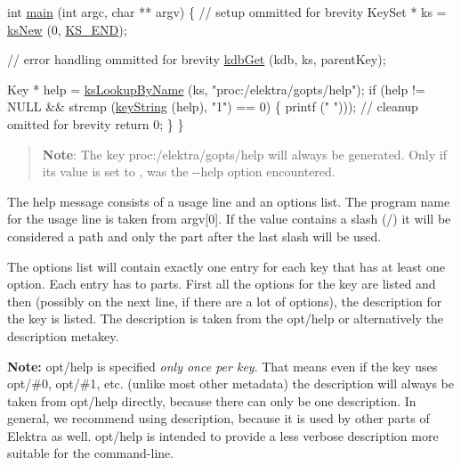 \begin{DoxyCode}
\textcolor{keywordtype}{int} \hyperlink{testio__doc_8c_a3c04138a5bfe5d72780bb7e82a18e627}{main} (\textcolor{keywordtype}{int} argc, \textcolor{keywordtype}{char} ** argv)
\{
  \textcolor{comment}{// setup ommitted for brevity}
  KeySet * ks = \hyperlink{group__keyset_ga671e1aaee3ae9dc13b4834a4ddbd2c3c}{ksNew} (0, \hyperlink{group__keyset_ga7a28fce3773b2c873c94ac80b8b4cd54}{KS\_END});

  \textcolor{comment}{// error handling ommitted for brevity}
  \hyperlink{group__kdb_ga28e385fd9cb7ccfe0b2f1ed2f62453a1}{kdbGet} (kdb, ks, parentKey);

  Key * help = \hyperlink{group__keyset_gad65d2cdcbb5381194a1688e169af8a83}{ksLookupByName} (ks, \textcolor{stringliteral}{"proc:/elektra/gopts/help"});
  \textcolor{keywordflow}{if} (help != NULL && strcmp (\hyperlink{group__keyvalue_ga880936f2481d28e6e2acbe7486a21d05}{keyString} (help), \textcolor{stringliteral}{"1"}) == 0)
  \{
    printf (\textcolor{stringliteral}{"%
      "})));
    \textcolor{comment}{// cleanup omitted for brevity}
    \textcolor{keywordflow}{return} 0;
  \}
\}
\end{DoxyCode}


\begin{quote}
{\bfseries Note}\+: The key {\ttfamily proc\+:/elektra/gopts/help} will always be generated. Only if its value is set to {}, was the {\ttfamily -\/-\/help} option encountered. \end{quote}


The help message consists of a usage line and an options list. The program name for the usage line is taken from {\ttfamily argv\mbox{[}0\mbox{]}}. If the value contains a slash ({\ttfamily /}) it will be considered a path and only the part after the last slash will be used.

The options list will contain exactly one entry for each key that has at least one option. Each entry has to parts. First all the options for the key are listed and then (possibly on the next line, if there are a lot of options), the description for the key is listed. The description is taken from the {\ttfamily opt/help} or alternatively the {\ttfamily description} metakey.

{\bfseries Note\+:} {\ttfamily opt/help} is specified {\itshape only once per key}. That means even if the key uses {\ttfamily opt/\#0}, {\ttfamily opt/\#1}, etc. (unlike most other metadata) the description will always be taken from {\ttfamily opt/help} directly, because there can only be one description. In general, we recommend using {\ttfamily description}, because it is used by other parts of Elektra as well. {\ttfamily opt/help} is intended to provide a less verbose description more suitable for the command-\/line.

